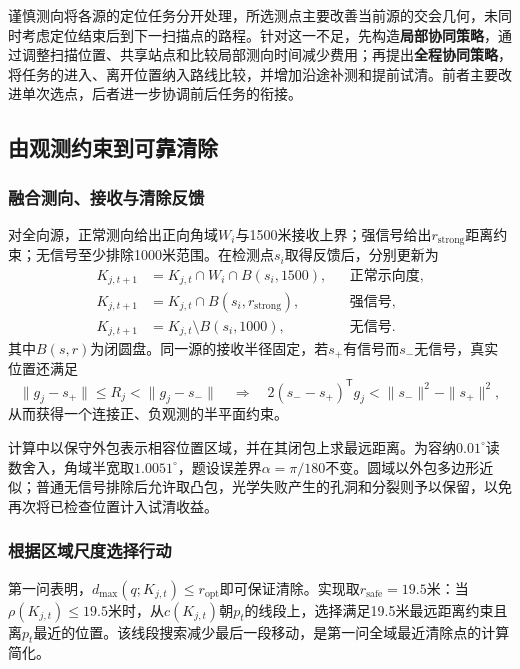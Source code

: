 谨慎测向将各源的定位任务分开处理，所选测点主要改善当前源的交会几何，未同时考虑定位结束后到下一扫描点的路程。针对这一不足，先构造\textbf{局部协同策略}，通过调整扫描位置、共享站点和比较局部测向时间减少费用；再提出\textbf{全程协同策略}，将任务的进入、离开位置纳入路线比较，并增加沿途补测和提前试清。前者主要改进单次选点，后者进一步协调前后任务的衔接。

\subsection{由观测约束到可靠清除}

\subsubsection{融合测向、接收与清除反馈}

对全向源，正常测向给出正向角域$W_i$与1500米接收上界；强信号给出$r_{\mathrm{strong}}$距离约束；无信号至少排除1000米范围。在检测点$s_i$取得反馈后，分别更新为
\begin{equation}
\begin{aligned}
 K_{j,t+1}&=K_{j,t}\cap W_i\cap B(s_i,1500), &&\text{正常示向度},\\
 K_{j,t+1}&=K_{j,t}\cap B(s_i,r_{\mathrm{strong}}), &&\text{强信号},\\
 K_{j,t+1}&=K_{j,t}\setminus B(s_i,1000), &&\text{无信号}.
\end{aligned}
\label{eq:q3-update}
\end{equation}
其中$B(s,r)$为闭圆盘。同一源的接收半径固定，若$s_+$有信号而$s_-$无信号，真实位置还满足
\begin{equation}
\|g_j-s_+\|\le R_j<\|g_j-s_-\|
\quad\Longrightarrow\quad
2(s_--s_+)^{\mathsf T}g_j<\|s_-\|^2-\|s_+\|^2,
\label{eq:q3-coupling}
\end{equation}
从而获得一个连接正、负观测的半平面约束。

计算中以保守外包表示相容位置区域，并在其闭包上求最远距离。为容纳$0.01^\circ$读数舍入，角域半宽取$1.0051^\circ$，题设误差界$\alpha=\pi/180$不变。圆域以外包多边形近似；普通无信号排除后允许取凸包，光学失败产生的孔洞和分裂则予以保留，以免再次将已检查位置计入试清收益。

\subsubsection{根据区域尺度选择行动}

第一问表明，$d_{\max}(q;K_{j,t})\le r_{\mathrm{opt}}$即可保证清除。实现取$r_{\mathrm{safe}}=19.5$米：当$\rho(K_{j,t})\le19.5$米时，从$c(K_{j,t})$朝$p_t$的线段上，选择满足19.5米最远距离约束且离$p_t$最近的位置。该线段搜索减少最后一段移动，是第一问全域最近清除点的计算简化。

